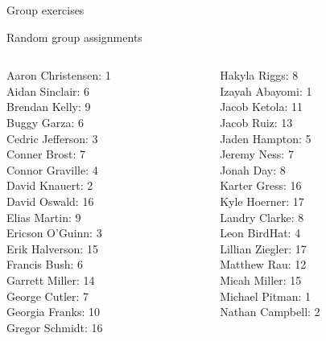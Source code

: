 \documentclass[10pt]{beamer}
\begin{document}
\begin{frame}[standout]
Group exercises
\end{frame}

\begin{frame}{Random group assignments}
\footnotesize 
\vfill 
\begin{columns}
\begin{column}{0.33\textwidth}
Aaron Christensen: 1 \\ 
Aidan Sinclair: 6 \\ 
Brendan Kelly: 9 \\ 
Buggy Garza: 6 \\ 
Cedric Jefferson: 3 \\ 
Conner Brost: 7 \\ 
Connor Graville: 4 \\ 
David Knauert: 2 \\ 
David Oswald: 16 \\ 
Elias Martin: 9 \\ 
Ericson O'Guinn: 3 \\ 
Erik Halverson: 15 \\ 
Francis Bush: 6 \\ 
Garrett Miller: 14 \\ 
George Cutler: 7 \\ 
Georgia Franks: 10 \\ 
Gregor Schmidt: 16 \\\end{column}
\begin{column}{0.33\textwidth}
Hakyla Riggs: 8 \\ 
Izayah Abayomi: 1 \\ 
Jacob Ketola: 11 \\ 
Jacob Ruiz: 13 \\ 
Jaden Hampton: 5 \\ 
Jeremy Ness: 7 \\ 
Jonah Day: 8 \\ 
Karter Gress: 16 \\ 
Kyle Hoerner: 17 \\ 
Landry Clarke: 8 \\ 
Leon BirdHat: 4 \\ 
Lillian Ziegler: 17 \\ 
Matthew Rau: 12 \\ 
Micah Miller: 15 \\ 
Michael Pitman: 1 \\ 
Nathan Campbell: 2 \\\end{column}

\end{columns}
\end{frame}
\end{document}

